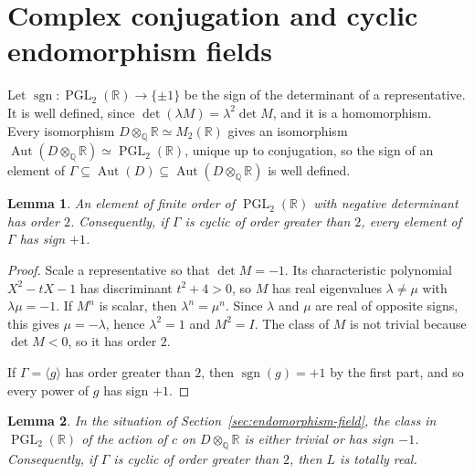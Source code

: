 \documentclass[11pt]{article}
\newtheorem{lemma}{Lemma}
\newcommand{\Q}{\mathbb Q}
\newcommand{\R}{\mathbb R}
\DeclareMathOperator{\PGL}{PGL}
\begin{document}
\section{Complex conjugation and cyclic endomorphism fields}
\label{sec:complex-conjugation}

Let \(\operatorname{sgn}:\PGL_2(\R)\to\{\pm1\}\) be the sign of the
determinant of a representative. It is well defined, since
\(\det(\lambda M)=\lambda^2\det M\), and it is a homomorphism. Every
isomorphism \(D\otimes_{\Q}\R\simeq M_2(\R)\) gives an isomorphism
\(\operatorname{Aut}(D\otimes_{\Q}\R)\simeq\PGL_2(\R)\), unique up to
conjugation, so the sign of an element of
\(\Gamma\subseteq\operatorname{Aut}(D)\subseteq
\operatorname{Aut}(D\otimes_{\Q}\R)\) is well defined.

\begin{lemma}\label{lem:sign}
An element of finite order of \(\PGL_2(\R)\) with negative determinant
has order \(2\). Consequently, if \(\Gamma\) is cyclic of order greater
than \(2\), every element of \(\Gamma\) has sign \(+1\).
\end{lemma}

\begin{proof}
Scale a representative so that \(\det M=-1\). Its characteristic
polynomial \(X^2-tX-1\) has discriminant \(t^2+4>0\), so \(M\) has real
eigenvalues \(\lambda\neq\mu\) with \(\lambda\mu=-1\). If \(M^n\) is
scalar, then \(\lambda^n=\mu^n\). Since \(\lambda\) and \(\mu\) are
real of opposite signs, this gives \(\mu=-\lambda\), hence
\(\lambda^2=1\) and \(M^2=I\). The class of \(M\) is not trivial
because \(\det M<0\), so it has order \(2\).

If \(\Gamma=\langle g\rangle\) has order greater than \(2\), then
\(\operatorname{sgn}(g)=+1\) by the first part, and so every power of
\(g\) has sign \(+1\).
\end{proof}

\begin{lemma}\label{lem:real}
In the situation of Section~\ref{sec:endomorphism-field}, the class in
\(\PGL_2(\R)\) of the action of \(c\) on \(D\otimes_{\Q}\R\) is either
trivial or has sign \(-1\). Consequently, if \(\Gamma\) is cyclic of
order greater than \(2\), then \(L\) is totally real.
\end{lemma}
\end{document}
